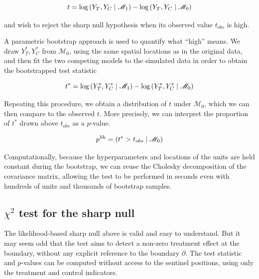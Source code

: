 \documentclass[letter]{article}
\newcommand{\genericdel}[3]{%
      \left#1#3\right#2
    }
\newcommand{\del}[1]{\genericdel(){#1}}
\let\Pr\relax
\DeclareMathOperator{\Pr}{\mathbb{P}}
\newcommand{\boundary}{\partial}
\newcommand{\modnull}{\mathscr{M}_0}
\newcommand{\modalt}{\mathscr{M}_1}
\begin{document}
\begin{equation}
    t = \log \Pr\del{Y_T, Y_C \mid \modalt} - \log \Pr\del{Y_T, Y_C \mid \modnull}
\end{equation}

and wish to reject the sharp null hypothesis when its observed value
\(t_{obs}\) is high.

A parametric bootstrap approach is used to quantify what ``high'' means.
We draw \(Y_T^*,Y_C^*\) from \(\modnull\), using the same spatial
locations as in the original data, and then fit the two competing models
to the simulated data in order to obtain the bootstrapped test statistic

\begin{equation}
    t^* = \log \Pr\del{Y_T^*, Y_C^* \mid \modalt} - \log \Pr\del{Y_T^*, Y_C^* \mid \modnull}
\end{equation}

Repeating this procedure, we obtain a distribution of \(t\) under
\(\modnull\), which we can then compare to the observed \(t\). More
precisely, we can interpret the proportion of \(t^*\) drawn above
\(t_{obs}\) as a \(p\)-value.

\begin{equation}
    p^{\mathrm{lik}} = \Pr\del{t^* > t_{obs} \mid \modnull}
\end{equation}

Computationally, because the hyperparameters and locations of the units
are held constant during the bootstrap, we can reuse the Cholesky
decomposition of the covariance matrix, allowing the test to be
performed in seconds even with hundreds of units and thousands of
bootstrap samples.
    


    	\subsection{\texorpdfstring{\(\chi^2\) test for the sharp
null}{\textbackslash{}chi\^{}2 test for the sharp null}}\label{chi2-test-for-the-sharp-null}

The likelihood-based sharp null above is valid and easy to understand.
But it may seem odd that the test aims to detect a non-zero treatment
effect at the boundary, without any explicit reference to the boundary
\(\boundary\). The test statistic and \(p\)-values can be computed
without access to the sentinel positions, using only the treatment and
control indicators.
\end{document}
